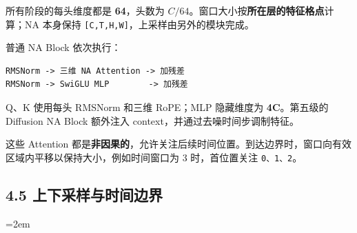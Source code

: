 \documentclass[
  11pt,
  a4paper,
  fontset=none]{ctexart}
\newcommand{\NotesTableStyle}{\linespread{1}\fontsize{9.5pt}{13pt}\selectfont\setlength{\tabcolsep}{4pt}\renewcommand{\arraystretch}{1.1}\setlength{\extrarowheight}{5pt}\setlength{\LTpre}{5pt}\setlength{\LTpost}{6pt}\setlength{\parskip}{0pt}\emergencystretch=2em}
\begin{document}
\endgroup

所有阶段的每头维度都是 \textbf{64}，头数为
\textbf{\(C/64\)}。窗口大小按\textbf{所在层的特征格点}计算；NA 本身保持
\texttt{{[}C,T,H,W{]}}，上采样由另外的模块完成。

普通 NA Block 依次执行：

\begin{verbatim}
RMSNorm -> 三维 NA Attention -> 加残差
RMSNorm -> SwiGLU MLP        -> 加残差
\end{verbatim}

Q、K 使用每头 RMSNorm 和三维 RoPE；MLP 隐藏维度为 \textbf{4C}。第五级的
Diffusion NA Block 额外注入 context，并通过去噪时间步调制特征。

这些 Attention
都是\textbf{非因果的}，允许关注后续时间位置。到达边界时，窗口向有效区域内平移以保持大小，例如时间窗口为
3 时，首位置关注 \texttt{0、1、2}。

\clearpage

\subsection{4.5 上下采样与时间边界}\label{ltx25-sampling}

\begingroup\NotesTableStyle\fontsize{10.5pt}{14pt}\selectfont\renewcommand{\arraystretch}{1.08}\setlength{\extrarowheight}{3pt}
\end{document}
